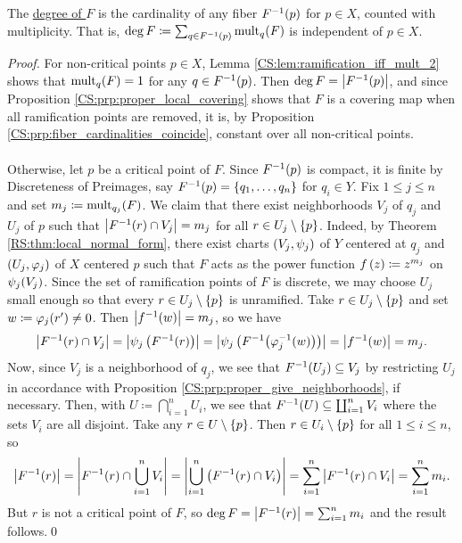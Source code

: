 \documentclass[../Moduli_Spaces_of_Riemann_Surfaces.tex]{subfiles}
\begin{document}
    \begin{defthm}\label{CS:thm:degree_sum_of_multiplicities}
        The \ul{degree of $F$} is the cardinality of any fiber $F^{-1}\!\left(p\right)$ for $p\in X$, counted with multiplicity. That is, $\deg F\coloneqq\sum_{q\in F^{-1}\left(p\right)}\operatorname{mult}_q\!\left(F\right)$ is independent of $p\in X$.
    \end{defthm}
    \begin{proof}
        For non-critical points $p\in X$, Lemma \ref{CS:lem:ramification_iff_mult_2} shows that $\operatorname{mult}_q\!\left(F\right)=1$ for any $q\in F^{-1}\!\left(p\right)$. Then $\deg F=\left|F^{-1}\!\left(p\right)\right|$, and since Proposition \ref{CS:prp:proper_local_covering} shows that $F$ is a covering map when all ramification points are removed, it is, by Proposition \ref{CS:prp:fiber_cardinalities_coincide}, constant over all non-critical points.\\\ \\
        Otherwise, let $p$ be a critical point of $F$. Since $F^{-1}\!\left(p\right)$ is compact, it is finite by Discreteness of Preimages, say $F^{-1}\!\left(p\right)=\left\{q_1,\dots,q_n\right\}$ for $q_i\in Y$. Fix $1\leq j\leq n$ and set $m_j\coloneqq\operatorname{mult}_{q_j}\!\left(F\right)$. We claim that there exist neighborhoods $V_j$ of $q_j$ and $U_j$ of $p$ such that $\left|F^{-1}\!\left(r\right)\cap V_j\right|=m_j$ for all $r\in U_j\setminus\left\{p\right\}$. Indeed, by Theorem \ref{RS:thm:local_normal_form}, there exist charts $\left(V_j,\psi_j\right)$ of $Y$ centered at $q_j$ and $\left(U_j,\varphi_j\right)$ of $X$ centered $p$ such that $F$ acts as the power function $f\left(z\right)\coloneqq z^{m_j}$ on $\psi_j\!\left(V_j\right)$. Since the set of ramification points of $F$ is discrete, we may choose $U_j$ small enough so that every $r\in U_j\setminus\left\{p\right\}$ is unramified. Take $r\in U_j\setminus\left\{p\right\}$ and set $w\coloneqq\varphi_j\!\left(r'\right)\neq0$. Then $\left|f^{-1}\!\left(w\right)\right|=m_j$, so we have
        \begin{equation*}
            \left|F^{-1}\!\left(r\right)\cap V_j\right|=\left|\psi_j\left(F^{-1}\!\left(r\right)\right)\right|=\left|\psi_j\left(F^{-1}\!\left(\varphi_j^{-1}\!\left(w\right)\right)\right)\right|=\left|f^{-1}\!\left(w\right)\right|=m_j.
        \end{equation*}
        Now, since $V_j$ is a neighborhood of $q_j$, we see that $F^{-1}\!\left(U_j\right)\subseteq V_j$ by restricting $U_j$ in accordance with Proposition \ref{CS:prp:proper_give_neighborhoods}, if necessary. Then, with $U\coloneqq\bigcap_{i=1}^{n}U_i$, we see that $F^{-1}\!\left(U\right)\subseteq\coprod_{i=1}^{n}V_i$ where the sets $V_i$ are all disjoint. Take any $r\in U\setminus\left\{p\right\}$. Then $r\in U_i\setminus\left\{p\right\}$ for all $1\leq i\leq n$, so
        \begin{equation*}
            \left|F^{-1}\!\left(r\right)\right|=\left|F^{-1}\!\left(r\right)\cap\bigcup_{i=1}^{n}V_i\right|=\left|\bigcup_{i=1}^{n}\left(F^{-1}\!\left(r\right)\cap V_i\right)\right|=\sum_{i=1}^{n}\left|F^{-1}\!\left(r\right)\cap V_i\right|=\sum_{i=1}^{n}m_i.
        \end{equation*}
        But $r$ is not a critical point of $F$, so $\deg F=\left|F^{-1}\!\left(r\right)\right|=\sum_{i=1}^{n}m_i$ and the result follows.\qed
    \end{proof}
\end{document}
